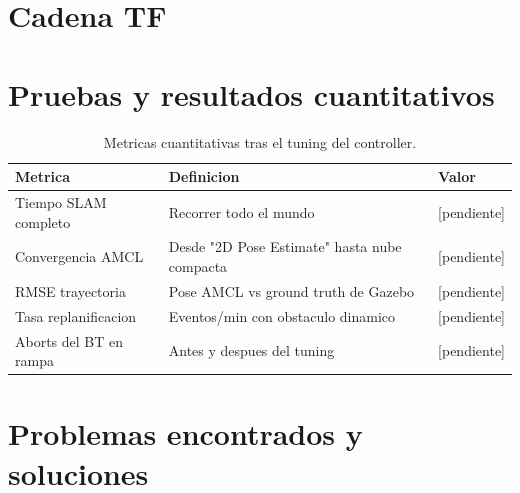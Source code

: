 \documentclass[11pt,a4paper]{article}
\begin{document}

\section{Cadena TF}
\label{sec:tf}



\section{Pruebas y resultados cuantitativos}
\label{sec:pruebas}


\begin{table}[H]
  \centering
  \caption{Metricas cuantitativas tras el tuning del controller.}
  \label{tab:metricas}
  \begin{tabularx}{\linewidth}{lXl}
    \toprule
    Metrica & Definicion & Valor \\
    \midrule
    Tiempo SLAM completo        & Recorrer todo el mundo                       & [pendiente] \\
    Convergencia AMCL           & Desde "2D Pose Estimate" hasta nube compacta & [pendiente] \\
    RMSE trayectoria            & Pose AMCL vs ground truth de Gazebo          & [pendiente] \\
    Tasa replanificacion        & Eventos/min con obstaculo dinamico           & [pendiente] \\
    Aborts del BT en rampa      & Antes y despues del tuning                   & [pendiente] \\
    \bottomrule
  \end{tabularx}
\end{table}

\section{Problemas encontrados y soluciones}
\label{sec:problemas}

\end{document}
